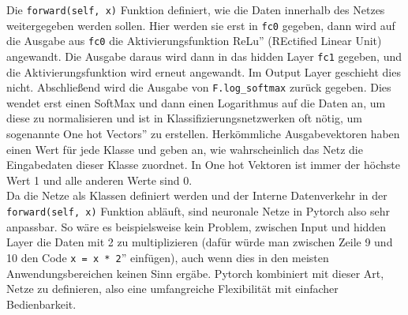 \documentclass[11pt]{article}
\begin{document}
Die \texttt{forward(self, x)} Funktion definiert, wie die Daten innerhalb des Netzes weitergegeben werden sollen. Hier werden sie erst in \texttt{fc0} gegeben, dann wird auf die Ausgabe aus \texttt{fc0} die Aktivierungsfunktion \glqq ReLu'' (REctified Linear Unit) angewandt. Die Ausgabe daraus wird dann in das hidden Layer \texttt{fc1} gegeben, und die Aktivierungsfunktion wird erneut angewandt. Im Output Layer geschieht dies nicht. Abschließend wird die Ausgabe von \texttt{F.log_softmax} zurück gegeben. Dies wendet erst einen SoftMax und dann einen Logarithmus auf die Daten an, \cite{6} um diese zu normalisieren und ist in Klassifizierungsnetzwerken oft nötig, um sogenannte \glqq One hot Vectors'' zu erstellen. Herkömmliche Ausgabevektoren haben einen Wert für jede Klasse und geben an, wie wahrscheinlich das Netz die Eingabedaten dieser Klasse zuordnet. In One hot Vektoren ist immer der höchste Wert 1 und alle anderen Werte sind 0.\\
Da die Netze als Klassen definiert werden und der Interne Datenverkehr in der\\ \texttt{forward(self, x)} Funktion abläuft, sind neuronale Netze in Pytorch also sehr anpassbar. So wäre es beispielsweise kein Problem, zwischen Input und hidden Layer die Daten mit 2 zu multiplizieren (dafür würde man zwischen Zeile 9 und 10 den Code \glqq\texttt{x = x * 2}'' einfügen), auch wenn dies in den meisten Anwendungsbereichen keinen Sinn ergäbe. Pytorch kombiniert mit dieser Art, Netze zu definieren, also eine umfangreiche Flexibilität mit einfacher Bedienbarkeit.
\end{document}
